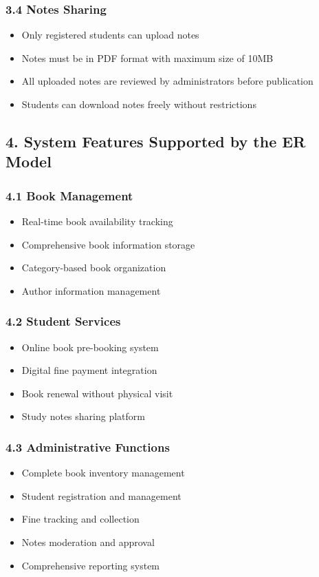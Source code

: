 \documentclass[12pt,a4paper]{article}
\begin{document}
\subsubsection{3.4 Notes Sharing}
\begin{itemize}
    \item Only registered students can upload notes
    \item Notes must be in PDF format with maximum size of 10MB
    \item All uploaded notes are reviewed by administrators before publication
    \item Students can download notes freely without restrictions
\end{itemize}

\subsection{4. System Features Supported by the ER Model}

\subsubsection{4.1 Book Management}
\begin{itemize}
    \item Real-time book availability tracking
    \item Comprehensive book information storage
    \item Category-based book organization
    \item Author information management
\end{itemize}

\subsubsection{4.2 Student Services}
\begin{itemize}
    \item Online book pre-booking system
    \item Digital fine payment integration
    \item Book renewal without physical visit
    \item Study notes sharing platform
\end{itemize}

\subsubsection{4.3 Administrative Functions}
\begin{itemize}
    \item Complete book inventory management
    \item Student registration and management
    \item Fine tracking and collection
    \item Notes moderation and approval
    \item Comprehensive reporting system
\end{itemize}
\end{document}
